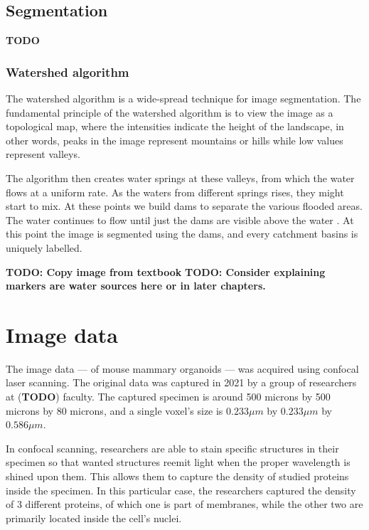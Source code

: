 \documentclass[
  digital,     %
  oneside,     %
  nosansbold,  %
  nocolorbold, %
  lof,         %
  lot,         %
]{fithesis4}
\begin{document}
\section{Segmentation}

\textbf{TODO}

\subsection{Watershed algorithm}

The watershed algorithm is a wide-spread technique for image segmentation. The
fundamental principle of the watershed algorithm is to view the image as a
topological map, where the intensities indicate the height of the landscape, in
other words, peaks in the image represent mountains or hills while low values
represent valleys.

The algorithm then creates water springs at these valleys, from which the water
flows at a uniform rate. As the waters from different springs rises, they might
start to mix. At these points we build dams to separate the various flooded
areas. The water continues to flow until just the dams are visible above the
water \cite{gonzalez2002}. At this point the image is segmented using the dams,
and every catchment basins is uniquely labelled.

\textbf{TODO: Copy image from textbook}
\textbf{TODO: Consider explaining markers are water sources here or in later
chapters.}

\chapter{Image data}

The image data --- of mouse mammary organoids --- was acquired using confocal
laser scanning. The original data was captured in 2021 by a group of
researchers at (\textbf{TODO}) faculty. The captured specimen is around 500
microns by 500 microns by 80 microns, and a single voxel's size is $0.233\mu m$ by
$0.233\mu m$ by $0.586\mu m$.

In confocal scanning, researchers are able to stain specific structures in
their specimen so that wanted structures reemit light when the proper wavelength
is shined upon them. This allows them to capture the density of studied proteins
inside the specimen. In this particular case, the researchers captured the
density of 3 different proteins, of which one is part of membranes, while the
other two are primarily located inside the cell's nuclei.
\end{document}
